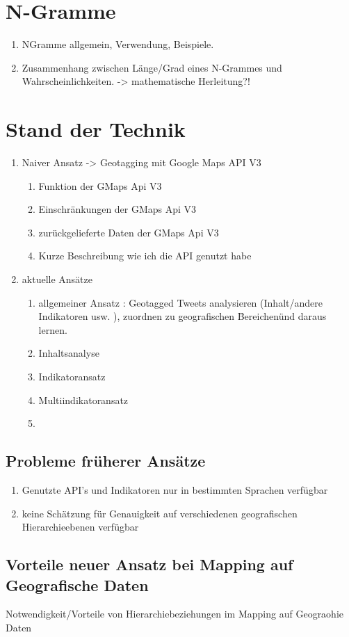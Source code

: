 	\section{N-Gramme}
		\begin{enumerate}
			\item NGramme allgemein, Verwendung, Beispiele. 
			\item {} Zusammenhang zwischen Länge/Grad eines N-Grammes und Wahrscheinlichkeiten. -> mathematische Herleitung?!
		\end{enumerate}

	\section{Stand der Technik}
		\begin{enumerate}
			\item Naiver Ansatz -> Geotagging mit Google Maps API V3
				\begin{enumerate}
					\item Funktion der GMaps Api V3
					\item Einschränkungen der GMaps Api V3
					\item zurückgelieferte Daten der GMaps Api V3
					\item Kurze Beschreibung wie ich die API genutzt habe
				\end{enumerate}
			\item aktuelle Ansätze
				\begin{enumerate}
					\item{ 
					allgemeiner Ansatz : Geotagged Tweets analysieren (Inhalt/andere Indikatoren usw. ), zuordnen zu geografischen \"Bereichen\" und daraus lernen.}
					\item{Inhaltsanalyse}
					\item{Indikatoransatz}
					\item{Multiindikatoransatz}
					\item

				\end{enumerate}
		\end{enumerate}

		\subsection{Probleme früherer Ansätze}
			\begin{enumerate}
				\item{Genutzte API's und Indikatoren nur in bestimmten Sprachen verfügbar}
				\item{keine Schätzung für Genauigkeit auf verschiedenen geografischen Hierarchieebenen verfügbar}  
			\end{enumerate}

		\subsection{Vorteile neuer Ansatz bei Mapping auf Geografische Daten}
		Notwendigkeit/Vorteile von Hierarchiebeziehungen im Mapping auf Geograohie Daten